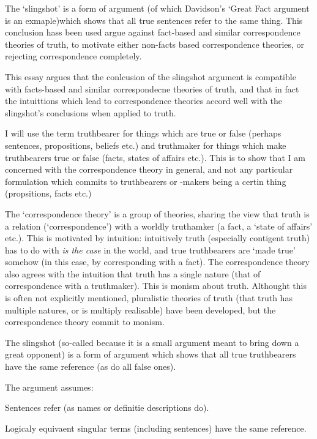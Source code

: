 The `slingshot' is a form of argument (of which Davidson's `Great Fact argument is an exmaple)which shows that all true sentences refer to the same thing.
This conclusion hass been used argue against fact-based and similar correspondence theories of truth, to motivate either non-facts based correspondence theories, or rejecting correspondence completely.

This essay argues that the conlcusion of the slingshot argument is compatible with facts-based and similar correspondecne theories of truth, and that in fact the intuittions which lead to correspondence theories accord well with the slingshot's conclusions when applied to truth.

I will use the term truthbearer for things which are true or false (perhaps sentences, propositions, beliefs etc.) and truthmaker for things which make truthbearers true or false (facts, states of affairs etc.).
This is to show that I am concerned with the correspondence theory in general, and not any particular formulation which commits to truthbearers or -makers being a certin thing (propsitions, facts etc.)

The `correspondence theory' is a group of theories, sharing the view that truth is a relation (`correspondence') with a worldly truthamker (a fact, a `state of affairs' etc.).
This is motivated by intuition: intuitively truth  (especially contigent truth) has to do with \emph{is the case} in the world, and true truthbearers are `made true' somehow (in this case, by corresponding with a fact).
The correspondence theory also agrees with the intuition that truth has a single nature (that of correspondence with a truthmaker). 
This is monism about truth.
Althought this is often not explicitly mentioned, pluralistic theories of truth (that truth has multiple natures, or is multiply realisable) have been developed, but the correspondence theory commit to monism.

The slingshot (so-called because it is a small argument meant to bring down a great opponent) is a form of argument which shows that all true truthbearers have the same reference (as do all false ones).

The argument assumes:

	\begin{thesis} \label{srefer}
	Sentences refer (as names or definitie descriptions do).
	\end{thesis}


	\begin{thesis} \label{sameref}
	Logicaly equivaent singular terms (including sentences) have the same reference.
	\end{thesis}

